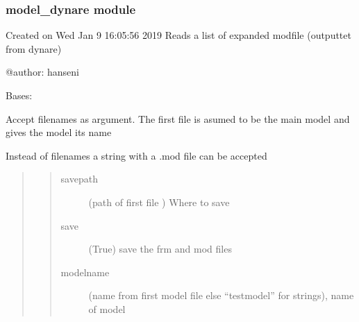 \documentclass[letterpaper,10pt,english]{sphinxmanual}
\begin{document}
\subsubsection{model\_dynare module}
\label{\detokenize{onboard/model_dynare:module-model_dynare}}\label{\detokenize{onboard/model_dynare:model-dynare-module}}\label{\detokenize{onboard/model_dynare::doc}}
\sphinxAtStartPar
Created on Wed Jan  9 16:05:56 2019
Reads a list of expanded modfile (outputtet from dynare)

\sphinxAtStartPar
@author: hanseni

\begin{fulllineitems}
\label{\detokenize{onboard/model_dynare:model_dynare.grap_modfile}}
\pysigstartsignatures
{}
\pysigstopsignatures
\sphinxAtStartPar
Bases: 

\sphinxAtStartPar
Accept filenames as argument. The first file is asumed to be the main model
and gives the model its name

\sphinxAtStartPar
Instead of filenames a string with a .mod file can be accepted
\begin{quote}
\begin{quote}\begin{description}
\item[{savepath}] \leavevmode
\sphinxAtStartPar
(path of first file ) Where to save

\item[{save}] \leavevmode
\sphinxAtStartPar
(True) save the frm and mod files

\item[{modelname}] \leavevmode
\sphinxAtStartPar
(name from first model file else “testmodel” for strings), name of model

\end{description}\end{quote}
\end{quote}


\end{fulllineitems}
\end{document}

